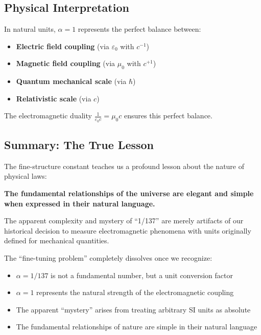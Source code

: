 \documentclass[12pt,a4paper]{article}
\begin{document}
\subsection{Physical Interpretation}
\label{subsec:physical_interpretation}

In natural units, $\alpha = 1$ represents the perfect balance between:

\begin{itemize}
	\item \textbf{Electric field coupling} (via $\varepsilon_0$ with $c^{-1}$)
	\item \textbf{Magnetic field coupling} (via $\mu_0$ with $c^{+1}$)
	\item \textbf{Quantum mechanical scale} (via $\hbar$)
	\item \textbf{Relativistic scale} (via $c$)
\end{itemize}

The electromagnetic duality $\frac{1}{\varepsilon_0 c} = \mu_0 c$ ensures this perfect balance.

\subsection{Summary: The True Lesson}
\label{subsec:true_lesson}

The fine-structure constant teaches us a profound lesson about the nature of physical laws:

\textbf{The fundamental relationships of the universe are elegant and simple when expressed in their natural language.}

The apparent complexity and mystery of ``1/137'' are merely artifacts of our historical decision to measure electromagnetic phenomena with units originally defined for mechanical quantities.

The ``fine-tuning problem'' completely dissolves once we recognize:

\begin{itemize}
	\item $\alpha = 1/137$ is not a fundamental number, but a unit conversion factor
	\item $\alpha = 1$ represents the natural strength of the electromagnetic coupling
	\item The apparent ``mystery'' arises from treating arbitrary SI units as absolute
	\item The fundamental relationships of nature are simple in their natural language
\end{itemize}
\end{document}
